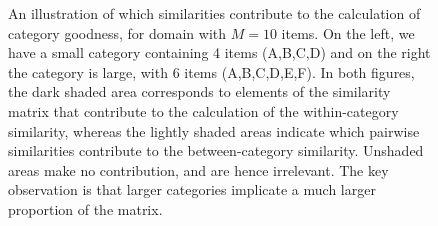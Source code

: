 \documentclass{apa}
\begin{document}
\begin{figure}
\begin{center}
\caption{An illustration of which similarities contribute to the calculation of category goodness, for domain with $M=10$ items. On the left, we have a small category containing 4 items (A,B,C,D) and on the right the category is large, with 6 items (A,B,C,D,E,F). In both figures, the dark shaded area corresponds to elements of the similarity matrix that contribute to the calculation of the within-category similarity, whereas the lightly shaded areas indicate which pairwise similarities contribute to the between-category similarity. Unshaded areas make no contribution, and are hence irrelevant. The key observation is that larger categories implicate a much larger proportion of the matrix.} \label{simmatrix}
\end{center}
\end{figure}








\end{document}

